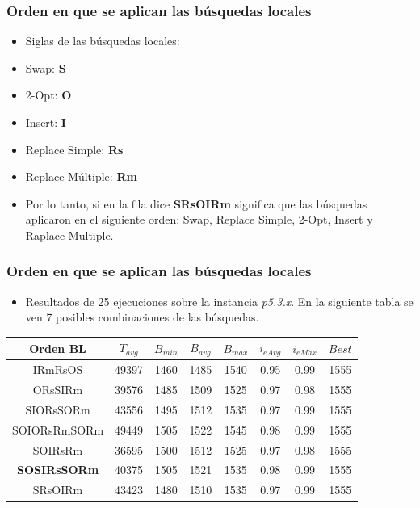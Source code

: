\documentclass{beamer}
\begin{document}

\begin{frame}
\frametitle{Orden en que se aplican las búsquedas locales}

\begin{itemize}
    \item Siglas de las búsquedas locales:
    \item Swap: \textbf{S}
    \item 2-Opt: \textbf{O}
    \item Insert: \textbf{I}
    \item Replace Simple: \textbf{Rs}
    \item Replace Múltiple: \textbf{Rm}
    \pause
    \item Por lo tanto, si en la fila dice \textbf{SRsOIRm} significa que las búsquedas aplicaron en el siguiente orden: Swap, Replace Simple, 2-Opt, Insert y Raplace Multiple.    
\end{itemize}

\end{frame}


\begin{frame}
\frametitle{Orden en que se aplican las búsquedas locales}

\begin{itemize}
    \item Resultados de 25 ejecuciones sobre la instancia \textit{p5.3.x}. En la siguiente tabla se ven 7 posibles combinaciones de las búsquedas.
\end{itemize}

\begin{table}
\begin{center}
\begin{tabular}{ |c|c|c|c|c|c|c|c| } 
\hline
Orden BL & $T_{avg}$ & $B_{min}$ & $B_{avg}$ & $B_{max}$ & $i_{eAvg}$ & $i_{eMax}$ & $Best$ \\
\hline
IRmRsOS & 49397 & 1460 & 1485 & 1540 & 0.95 & 0.99 & 1555  \\
ORsSIRm & 39576 & 1485 & 1509 & 1525 & 0.97 & 0.98 & 1555  \\
SIORsSORm & 43556 & 1495 & 1512 & 1535 & 0.97 & 0.99 & 1555  \\
SOIORsRmSORm & 49449 & 1505 & 1522 & 1545 & 0.98 & 0.99 & 1555  \\
SOIRsRm & 36595 & 1500 & 1512 & 1525 & 0.97 & 0.98 & 1555  \\
\textbf{SOSIRsSORm} & 40375 & 1505 & 1521 & 1535 & 0.98 & 0.99 & 1555  \\
SRsOIRm & 43423 & 1480 & 1510 & 1535 & 0.97 & 0.99 & 1555  \\
\hline
\end{tabular}
\end{center}
\label{tab:resultadosListaLS1}
\end{table}

\end{frame}
\end{document}
